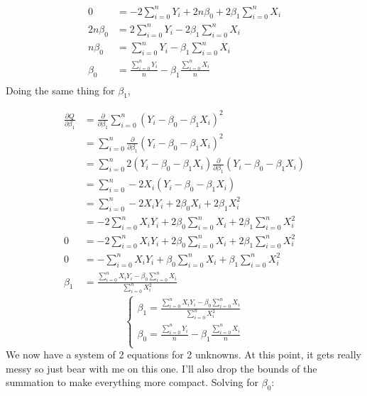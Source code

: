\documentclass[12pt,a4paper]{article}
\begin{document}
    \begin{align*}
        0 &=  -2\sum_{i=0}^{n}Y_i + 2n\beta_0 +2\beta_1\sum_{i=0}^{n}X_i \\
        2n\beta_0 &=  2\sum_{i=0}^{n}Y_i - 2\beta_1\sum_{i=0}^{n}X_i \\
        n\beta_0 &= \sum_{i=0}^{n}Y_i - \beta_1\sum_{i=0}^{n}X_i \\
            \beta_0 &= \frac{\displaystyle\sum_{i=0}^n Y_i}{n} - \beta_1\frac{\displaystyle\sum_{i=0}^n X_i}{n} \\
    \end{align*}
Doing the same thing for $\beta_1$,

\begin{align*}
     \frac{\partial Q}{\partial \beta_1}&=  \frac{\partial}{\partial \beta_1}\sum_{i=0}^n(Y_i - \beta_0 - \beta_1X_i )^2 \\
     &=  \sum_{i=0}^n\frac{\partial}{\partial \beta_1}(Y_i - \beta_0 - \beta_1X_i )^2 \\
     &=  \sum_{i=0}^{n}2(Y_i - \beta_0 - \beta_1X_i )\frac{\partial}{\partial \beta_1}(Y_i - \beta_0 - \beta_1X_i ) \\
     &=  \sum_{i=0}^{n}-2X_i(Y_i - \beta_0 - \beta_1X_i ) \\
     &=  \sum_{i=0}^{n}-2X_iY_i +2\beta_0X_i + 2\beta_1X_i^2  \\
     &=  -2\sum_{i=0}^{n}X_iY_i +2\beta_0\sum_{i=0}^{n}X_i + 2\beta_1\sum_{i=0}^{n}X_i^2  \\
    0 &=  -2\sum_{i=0}^{n}X_iY_i +2\beta_0\sum_{i=0}^{n}X_i + 2\beta_1\sum_{i=0}^{n}X_i^2  \\
    0 &=  -\sum_{i=0}^{n}X_iY_i +\beta_0\sum_{i=0}^{n}X_i + \beta_1\sum_{i=0}^{n}X_i^2  \\
    \beta_1 &= \frac{\displaystyle\sum_{i=0}^{n}X_iY_i -\beta_0\displaystyle\sum_{i=0}^{n}X_i}{\displaystyle\sum_{i=0}^{n}X_i^2}
\end{align*}
$$\begin{cases}
        \beta_1 = \frac{\displaystyle\sum_{i=0}^{n}X_iY_i -\beta_0\displaystyle\sum_{i=0}^{n}X_i}{\displaystyle\sum_{i=0}^{n}X_i^2} \\
        \beta_0 = \frac{\displaystyle\sum_{i=0}^n Y_i}{\displaystyle n} - \beta_1\frac{\displaystyle\sum_{i=0}^n X_i}{\displaystyle n} \\
    \end{cases}$$
    We now have a system of 2 equations for 2 unknowns. At this point, it gets really messy so just bear with me on this one. I'll also drop the bounds of the summation to make everything more compact. Solving for $\beta_0$:
\end{document}
